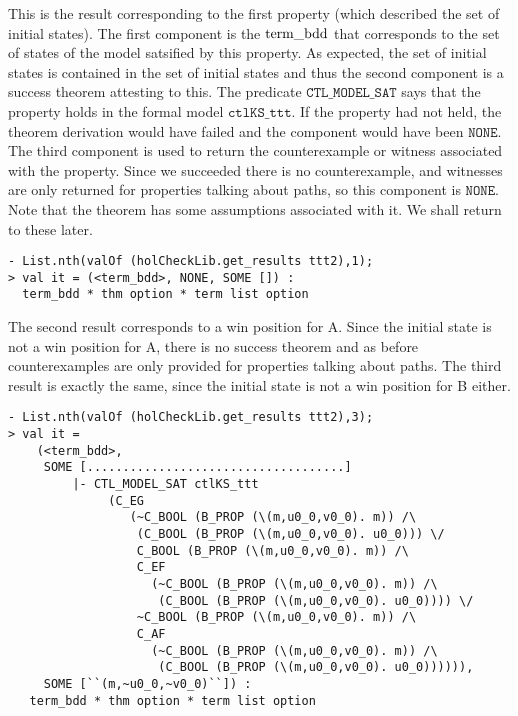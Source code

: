 \documentclass[12pt,fleqn]{article}
\begin{document}
This is the result corresponding to the first property (which described the set of initial states).  The first component is the \(\textup{term\_bdd}\) that corresponds to the set of states of the model satsified by this property. As expected, the set of initial states is contained in the set of initial states and thus the second component is a success theorem attesting to this. The predicate \( \mathtt{CTL\_MODEL\_SAT} \) says that the property holds in the formal model \( \mathtt{ctlKS\_ttt}\). If the property had not held, the theorem derivation would have failed and the component would have been \( \mathtt{NONE}\). The third component is used to return the counterexample or witness associated with the property. Since we succeeded there is no counterexample, and witnesses are only returned for properties talking about paths, so this component is \( \mathtt{NONE}\). Note that the theorem has some assumptions associated with it. We shall return to these later.

\begin{session}\begin{verbatim}
- List.nth(valOf (holCheckLib.get_results ttt2),1);
> val it = (<term_bdd>, NONE, SOME []) :
  term_bdd * thm option * term list option
\end{verbatim}\end{session}

The second result corresponds to a win position for A. Since the initial state is not a win position for A, there is no success theorem and as before counterexamples are only provided for properties talking about paths. The third result is exactly the same, since the initial state is not a win position for B either.

\begin{session}\begin{verbatim}
- List.nth(valOf (holCheckLib.get_results ttt2),3);
> val it =
    (<term_bdd>,
     SOME [....................................]
         |- CTL_MODEL_SAT ctlKS_ttt
              (C_EG
                 (~C_BOOL (B_PROP (\(m,u0_0,v0_0). m)) /\
                  (C_BOOL (B_PROP (\(m,u0_0,v0_0). u0_0))) \/
                  C_BOOL (B_PROP (\(m,u0_0,v0_0). m)) /\
                  C_EF
                    (~C_BOOL (B_PROP (\(m,u0_0,v0_0). m)) /\
                     (C_BOOL (B_PROP (\(m,u0_0,v0_0). u0_0)))) \/
                  ~C_BOOL (B_PROP (\(m,u0_0,v0_0). m)) /\
                  C_AF
                    (~C_BOOL (B_PROP (\(m,u0_0,v0_0). m)) /\
                     (C_BOOL (B_PROP (\(m,u0_0,v0_0). u0_0)))))),
     SOME [``(m,~u0_0,~v0_0)``]) :
   term_bdd * thm option * term list option
\end{verbatim}\end{session}
\end{document}

